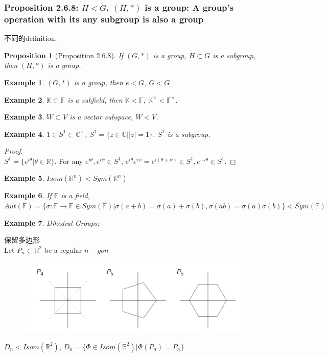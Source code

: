 \documentclass[11pt,a4paper]{article}
\newtheorem{proposition}{Proposition}
\newtheorem{example}{Example}
\begin{document}
\subsubsection{Proposition 2.6.8: $H<G$, $(H,*)$ is a group: A group's operation with its any subgroup is also a group}
不同的definition.
\begin{proposition}[Proposition 2.6.8]
    If $(G, *)$ is a group, $H \subset G$ is a subgroup, then $(H, *)$ is a group.
\end{proposition}
\begin{example}
    $(G,*)$ is a group, then ${e}<G,\ G<G$.
\end{example}
\begin{example}
$\mathbb{K}\subset \mathbb{F}$ is a subfield, then $\mathbb{K}<\mathbb{F},\ \mathbb{K}^{\times}<\mathbb{F}^{\times}$.
\end{example}
\begin{example}
$W\subset V$ is a vector subspace, $W<V$.
\end{example}
\begin{example}
$1\in S^1\subset \mathbb{C}^{\times}$, $S^1=\{z\in\mathbb{C}| |z|=1\}$. $S^1$ is a subgroup.
\end{example}
\begin{proof}
\quad\\
$S^1=\{e^{i\theta}| \theta\in \mathbb{R}\}$. For any $e^{i\theta}, e^{i\psi}\in S^1$, $e^{i\theta}e^{i\psi}=e^{i(\theta+\psi)}\in S^1, e^{-i\theta}\in S^1$.
\end{proof}
\begin{example}
$Isom(\mathbb{R}^n)<Sym(\mathbb{R}^n)$
\end{example}
\begin{example}
If $\mathbb{F}$ is a field, $Aut(\mathbb{F})=\{\sigma:\mathbb{F}\rightarrow	\mathbb{F}\in Sym(\mathbb{F})| \sigma(a+b)=\sigma(a)+\sigma(b), \sigma(ab)=\sigma(a)\sigma(b)\}<Sym(\mathbb{F})$
\end{example}
\begin{example}
    Dihedral Groups:
\end{example}
保留多边形\\
Let $P_n\subset \mathbb{R}^2$ be a regular $n-gon$
\begin{center}\begin{figure}[htbp]
    \centering
    \includegraphics[scale=0.8]{Dihedral Groups.png}
\end{figure}\end{center}
$D_n<Isom(\mathbb{R}^2)$, $D_n=\{\Phi \in Isom(\mathbb{R}^2)|\Phi(P_n)=P_n\}$
\end{document}
